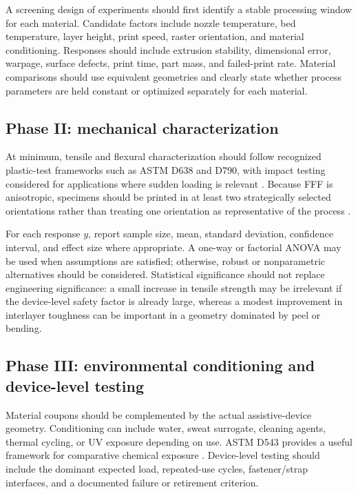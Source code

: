 \documentclass[11pt]{article}
\begin{document}
A screening design of experiments should first identify a stable processing window for each material. Candidate factors include nozzle temperature, bed temperature, layer height, print speed, raster orientation, and material conditioning. Responses should include extrusion stability, dimensional error, warpage, surface defects, print time, part mass, and failed-print rate. Material comparisons should use equivalent geometries and clearly state whether process parameters are held constant or optimized separately for each material.

\subsection{Phase II: mechanical characterization}

At minimum, tensile and flexural characterization should follow recognized plastic-test frameworks such as ASTM D638 and D790, with impact testing considered for applications where sudden loading is relevant \cite{astmd638,astmd790,astmd256}. Because FFF is anisotropic, specimens should be printed in at least two strategically selected orientations rather than treating one orientation as representative of the process \cite{chacon2017,cojocaru2022}.

For each response $y$, report sample size, mean, standard deviation, confidence interval, and effect size where appropriate. A one-way or factorial ANOVA may be used when assumptions are satisfied; otherwise, robust or nonparametric alternatives should be considered. Statistical significance should not replace engineering significance: a small increase in tensile strength may be irrelevant if the device-level safety factor is already large, whereas a modest improvement in interlayer toughness can be important in a geometry dominated by peel or bending.

\subsection{Phase III: environmental conditioning and device-level testing}

Material coupons should be complemented by the actual assistive-device geometry. Conditioning can include water, sweat surrogate, cleaning agents, thermal cycling, or UV exposure depending on use. ASTM D543 provides a useful framework for comparative chemical exposure \cite{astmd543}. Device-level testing should include the dominant expected load, repeated-use cycles, fastener/strap interfaces, and a documented failure or retirement criterion.
\end{document}
